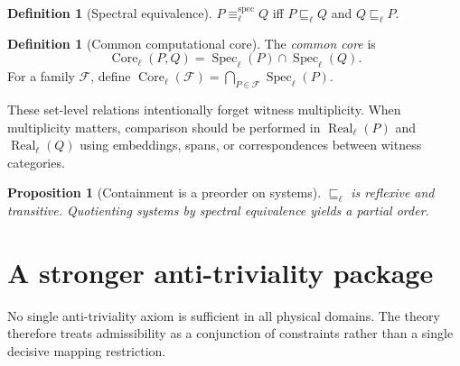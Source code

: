 \documentclass[11pt,a4paper]{article}
\theoremstyle{clean}
\newtheorem{proposition}[theorem]{Proposition}
\theoremstyle{definition}
\newtheorem{definition}[theorem]{Definition}
\newcommand{\Spec}{\operatorname{Spec}}
\newcommand{\Real}{\operatorname{Real}}
\newcommand{\Core}{\operatorname{Core}}
\begin{document}
\begin{definition}[Spectral equivalence]
$P\equiv^{\mathrm{spec}}_\ell Q$ iff $P\sqsubseteq_\ell Q$ and $Q\sqsubseteq_\ell P$.
\end{definition}

\begin{definition}[Common computational core]
The \emph{common core} is
\[
\Core_\ell(P,Q)=\Spec_\ell(P)\cap\Spec_\ell(Q).
\]
For a family $\mathcal F$, define $\Core_\ell(\mathcal F)=\bigcap_{P\in\mathcal F}\Spec_\ell(P)$.
\end{definition}

These set-level relations intentionally forget witness multiplicity. When multiplicity matters, comparison should be performed in $\Real_\ell(P)$ and $\Real_\ell(Q)$ using embeddings, spans, or correspondences between witness categories.

\begin{proposition}[Containment is a preorder on systems]
$\sqsubseteq_\ell$ is reflexive and transitive. Quotienting systems by spectral equivalence yields a partial order.
\end{proposition}

\section{A stronger anti-triviality package}

No single anti-triviality axiom is sufficient in all physical domains. The theory therefore treats admissibility as a conjunction of constraints rather than a single decisive mapping restriction.
\end{document}
